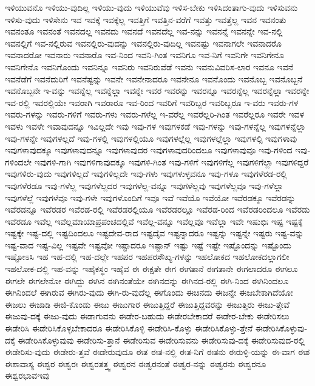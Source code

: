 {ಇಳಿಯುವನೊ
ಇಳಿಯು-ವುದಿಲ್ಲ
ಇಳಿಯು-ವುದು
ಇಳಿಯುವೆವು
ಇಳಿಸ-ಬೇಕು
ಇಳಿಸಿದಂತಾಗು-ವುದು
ಇಳಿಸುವನು
ಇಳಿಸು-ವುದು
ಇಳಿಸೇನು
ಇವ
ಇವಕ್ಕೆ
ಇವಕ್ಕೆಲ್ಲ
ಇವತ್ತಿಗೆ
ಇವತ್ತಿನ-ವರೆಗೆ
ಇವತ್ತು
ಇವತ್ತೆಲ್ಲ
ಇವನ
ಇವನಂತು
ಇವನಂತೂ
ಇವನಂತೆ
ಇವನದಲ್ಲ
ಇವನದು
ಇವನದೆ
ಇವನದೆಲ್ಲ
ಇವ-ನನ್ನು
ಇವನನ್ನೆ
ಇವನನ್ನೇ
ಇವ-ನಲ್ಲಿ
ಇವನಲ್ಲಿಗೆ
ಇವ-ನಲ್ಲಿರುವ
ಇವನಲ್ಲಿರು-ವುದನ್ನು
ಇವನಲ್ಲಿರು-ವುದಿಲ್ಲ
ಇವನಷ್ಟು
ಇವನಾಗಲೇ
ಇವನಾದರೊ
ಇವನಾದರೋ
ಇವನಾರು
ಇವನಾರೊ
ಇವ-ನಿಂದ
ಇವನಿ-ಗಿಂತ
ಇವನಿಗೂ
ಇವ-ನಿಗೆ
ಇವನಿಗೇ
ಇವನಿಗೇನೂ
ಇವನಿಗೇನೊ
ಇವನಿಗೊಂದು
ಇವನಿನ್ನೂ
ಇವನಿರು
ಇವನಿರುವೆಡೆ
ಇವನು
ಇವನುವಿವರಿಸ-ಲಾರ
ಇವನೂ
ಇವನೆ
ಇವನೆಡೆಗೆ
ಇವನೆದುರಿಗೆ
ಇವನೆಷ್ಟನ್ನು
ಇವನೇ
ಇವನೇನಾದರೂ
ಇವನೇನೂ
ಇವನೊಂದು
ಇವನೊಬ್ಬ
ಇವನೊಬ್ಬನೆ
ಇವನೊಬ್ಬನೇ
ಇ-ವನ್ನು
ಇವನ್ನೆಲ್ಲ
ಇವನ್ನೆಲ್ಲಾ
ಇವನ್ನೇ
ಇವರ
ಇವರನ್ನು
ಇವರನ್ನೂ
ಇವರನ್ನೆಲ್ಲ
ಇವರನ್ನೆಲ್ಲಾ
ಇವರನ್ನೇ
ಇವ-ರಲ್ಲಿ
ಇವರಲ್ಲಿಯೇ
ಇವರಾಗಿ
ಇವರಾರೂ
ಇವ-ರಿಂದ
ಇವರಿಗೆ
ಇವರಿಬ್ಬರ
ಇವರಿಬ್ಬರೂ
ಇ-ವರು
ಇವರು-ಗಳ
ಇವರು-ಗಳನ್ನು
ಇವರು-ಗಳಿಗೆ
ಇವರು-ಗಳು
ಇವರು-ಗಳೆಲ್ಲ
ಇ-ವರೆಲ್ಲ
ಇವರೆಲ್ಲರಿ-ಗಿಂತ
ಇವರೆಲ್ಲರೂ
ಇವರೇ
ಇವಳ
ಇವಳು
ಇವಳೇ
ಇವಾವುದನ್ನೂ
ಇವಿಲ್ಲದೇ
ಇವು
ಇವು-ಗಳ
ಇವುಗಳಕಡೆ
ಇವು-ಗಳನ್ನು
ಇವು-ಗಳನ್ನೆಲ್ಲ
ಇವುಗಳನ್ನೆಲ್ಲಾ
ಇವು-ಗಳನ್ನೇ
ಇವುಗಳಲ್ಲದೆ
ಇವು-ಗಳಲ್ಲಿ
ಇವುಗಳಲ್ಲಿಯೂ
ಇವುಗಳಲ್ಲೆಲ್ಲ
ಇವುಗಳಲ್ಲೆಲ್ಲಾ
ಇವುಗಳಲ್ಸಿ
ಇವುಗಳಾವು
ಇವುಗಳಾವುದಕ್ಕೂ
ಇವುಗಳಾವುದನ್ನೂ
ಇವುಗಳಾವುದರ
ಇವುಗಳಾವುದರಿಂದಲೂ
ಇವುಗಳಾವುವೂ
ಇವು-ಗಳಿಂದ
ಇವು-ಗಳಿಂದಲೇ
ಇವುಗಳಿ-ಗಾಗಿ
ಇವುಗಳಿಗಾವುದಕ್ಕೂ
ಇವುಗಳಿ-ಗಿಂತ
ಇವು-ಗಳಿಗೆ
ಇವುಗಳಿಗೆಲ್ಲ
ಇವುಗಳಿಗೆಲ್ಲಾ
ಇವುಗಳಿದ್ದರೆ
ಇವುಗಳಿರು-ವುದು
ಇವುಗಳಿಲ್ಲದೆ
ಇವುಗಳಿಲ್ಲದೇ
ಇವು-ಗಳು
ಇವುಗಳುಳ್ಳವನೂ
ಇವು-ಗಳೂ
ಇವುಗಳೆರಡ-ರಲ್ಲಿ
ಇವುಗಳೆರಡೂ
ಇವು-ಗಳೆಲ್ಲ
ಇವುಗಳೆಲ್ಲದರ
ಇವುಗಳೆಲ್ಲ-ವನ್ನೂ
ಇವುಗಳೆಲ್ಲವು
ಇವುಗಳೆಲ್ಲವೂ
ಇವು-ಗಳೆಲ್ಲಾ
ಇವುಗಳೆಲ್ಲೆ
ಇವುಗಳೆವೂ
ಇವು-ಗಳೇ
ಇವುಗಳೊಂದಿಗೆ
ಇವೂ
ಇವೆ
ಇವೆಯೊ
ಇವೆಯೋ
ಇವೆರಡಕ್ಕೂ
ಇವೆರಡನ್ನು
ಇವೆರಡನ್ನೂ
ಇವೆರಡರ
ಇವೆರಡ-ರಲ್ಲಿ
ಇವೆರಡರಲ್ಲಿಯೂ
ಇವೆರಡರಲ್ಲೂ
ಇವೆರಡ-ರಿಂದ
ಇವೆರಡರಿಂದಲೂ
ಇವೆರಡು
ಇವೆರಡೂ
ಇವೆಲ್ಲ
ಇವೆಲ್ಲಮಾಯಾಪ್ರಪಂಚದಲ್ಲಿವೆ
ಇವೆಲ್ಲ-ವನ್ನೂ
ಇವೆಲ್ಲವೂ
ಇವೆಲ್ಲಾ
ಇವೇ
ಇಷುಭಿಃ
ಇಷ್ಟ
ಇಷ್ಟಕ್ಕೆ
ಇಷ್ಟಕ್ಕೇ
ಇಷ್ಟ-ದಲ್ಲಿ
ಇಷ್ಟದಿಂದಲೂ
ಇಷ್ಟದೇವ-ರಾದ
ಇಷ್ಟದೈವ
ಇಷ್ಟನ್ನಾದರೂ
ಇಷ್ಟನ್ನು
ಇಷ್ಟನ್ನೇ
ಇಷ್ಟರು
ಇಷ್ಟ-ವನ್ನು
ಇಷ್ಟ-ವಾದ
ಇಷ್ಟ-ವಿಲ್ಲ
ಇಷ್ಟವೇ
ಇಷ್ಟವೋ
ಇಷ್ಟಾದರೂ
ಇಷ್ಟಾನ್
ಇಷ್ಟು
ಇಷ್ಟೆ
ಇಷ್ಟೇ
ಇಷ್ಟೊಂದನ್ನು
ಇಷ್ಟೊಂದು
ಇಷ್ಟೋಽಸಿ
ಇಹ
ಇಹ-ದಲ್ಲಿ
ಇಹ-ದಲ್ಲೇ
ಇಹಪರ
ಇಹಪರಸೌಖ್ಯ-ಗಳನ್ನು
ಇಹಲೋಕದ
ಇಹಲೋಕದಲ್ಲಾಗಲೀ
ಇಹಲೋಕ-ದಲ್ಲಿ
ಇಹ-ವನ್ನು
ಇಹೈಕಸ್ಥಂ
ಇಹೈವ
ಈ
ಈಕ್ಷತೇ
ಈಗ
ಈಗತಾನೆ
ಈಗತಾನೇ
ಈಗಲಾದರೂ
ಈಗಲೂ
ಈಗಲೇ
ಈಗಲೇನೋ
ಈಗಿದ್ದು
ಈಗಿನ
ಈಗಿನಂತೆಯೇ
ಈಗಿನದನ್ನು
ಈಗಿನದ-ರಲ್ಲಿ
ಈಗಿ-ನಿಂದ
ಈಗಿನಿಂದಲೂ
ಈಗಿನಿಂದಲೆ
ಈಗಿರುವ
ಈಗಿರು-ವುದು
ಈಗಿ-ರು-ವುದೆಲ್ಲ
ಈಗೊಂದು
ಈಚಿನದು
ಈಜನ್ನೇ
ಈಜಬೇಕಾಗಿದೆಯೋ
ಈಜಲು
ಈಜಾಡಿ
ಈಜಿ-ಕೊಂಡು
ಈಜು
ಈಜುಗಾರ
ಈಜುತ್ತಿದ್ದರೆ
ಈಜುತ್ತಿದ್ದವರನ್ನು
ಈಜುತ್ತಿರು
ಈಜು-ತ್ತೇವೆ
ಈಜುವು-ದಕ್ಕೆ
ಈಜು-ವುದು
ಈಡಾಗುವನು
ಈಡೇರ-ಬಹುದು
ಈಡೇರಬೇಕಾದರೆ
ಈಡೇರ-ಬೇಕು
ಈಡೇರಿಸಲು
ಈಡೇರಿಸಿ
ಈಡೇರಿಸಿಕೊಳ್ಳಬೇಕಾದರೂ
ಈಡೇರಿಸಿಕೊಳ್ಳಿ
ಈಡೇರಿಸಿ-ಕೊಳ್ಳು
ಈಡೇರಿಸಿಕೊಳ್ಳು-ತ್ತೇನೆ
ಈಡೇರಿಸಿಕೊಳ್ಳುವು-ದಕ್ಕೆ
ಈಡೇರಿಸಿಕೊಳ್ಳುವುವು
ಈಡೇರಿಸು-ತ್ತಾನೆ
ಈಡೇರಿಸುವ
ಈಡೇರಿಸುವನು
ಈಡೇರಿಸುವು-ದಕ್ಕೆ
ಈಡೇರಿಸುವುದ-ರಲ್ಲಿ
ಈಡೇರಿಸು-ವುದು
ಈಡೇರು-ತ್ತವೆ
ಈಡೇರುವುದೂ
ಈತ
ಈತ-ನಲ್ಲಿ
ಈತ-ನಿಗೆ
ಈತನು
ಈರುಳ್ಳಿ-ಯನ್ನು
ಈ-ವಾಗ
ಈಶ
ಈಶಾವಾಸ್ಯ
ಈಶ್ವರ
ಈಶ್ವರಃ
ಈಶ್ವರತತ್ತ್ವ
ಈಶ್ವರನ
ಈಶ್ವರನಂತೆ
ಈಶ್ವರ-ನನ್ನು
ಈಶ್ವರನು
ಈಶ್ವರನೂ
ಈಶ್ವರಭಾವಇವು
}

